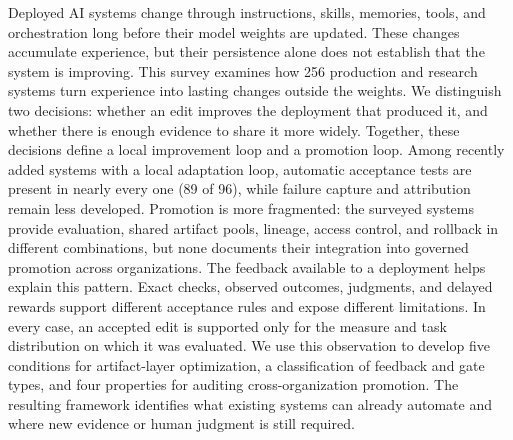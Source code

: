 Deployed AI systems change through instructions, skills, memories, tools, and orchestration long before their model weights are updated. These changes accumulate experience, but their persistence alone does not establish that the system is improving. This survey examines how 256 production and research systems turn experience into lasting changes outside the weights. We distinguish two decisions: whether an edit improves the deployment that produced it, and whether there is enough evidence to share it more widely. Together, these decisions define a local improvement loop and a promotion loop. Among recently added systems with a local adaptation loop, automatic acceptance tests are present in nearly every one (89 of 96), while failure capture and attribution remain less developed. Promotion is more fragmented: the surveyed systems provide evaluation, shared artifact pools, lineage, access control, and rollback in different combinations, but none documents their integration into governed promotion across organizations. The feedback available to a deployment helps explain this pattern. Exact checks, observed outcomes, judgments, and delayed rewards support different acceptance rules and expose different limitations. In every case, an accepted edit is supported only for the measure and task distribution on which it was evaluated. We use this observation to develop five conditions for artifact-layer optimization, a classification of feedback and gate types, and four properties for auditing cross-organization promotion. The resulting framework identifies what existing systems can already automate and where new evidence or human judgment is still required.
